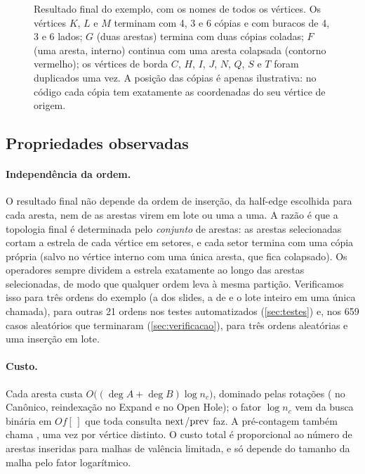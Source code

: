 \begin{figure}[ht]
\centering

\caption{Resultado final do exemplo, com os nomes de todos os vértices. Os vértices $K$, $L$ e $M$ terminam com 4, 3 e 6
cópias e com buracos de 4, 3 e 6 lados; $G$ (duas arestas) termina com duas cópias coladas; $F$ (uma aresta, interno)
continua com uma aresta colapsada (contorno vermelho); os vértices de borda $C$, $H$, $I$, $J$, $N$, $Q$, $S$ e $T$
foram duplicados uma vez. A posição das cópias é apenas ilustrativa: no código cada cópia tem exatamente as
coordenadas do seu vértice de origem.}
\label{fig:final}
\end{figure}

\subsection{Propriedades observadas}

\paragraph{Independência da ordem.} O resultado final não depende da ordem de inserção, da half-edge escolhida para
cada aresta, nem de as arestas virem em lote ou uma a uma. A razão é que a topologia final é determinada pelo
\emph{conjunto} de arestas: as arestas selecionadas cortam a estrela de cada vértice em setores, e cada setor termina com
uma cópia própria (salvo no vértice interno com uma única aresta, que fica colapsado). Os operadores sempre dividem a
estrela exatamente ao longo das arestas selecionadas, de modo que qualquer ordem leva à mesma partição. Verificamos isso
para três ordens do exemplo (a dos slides, a de  e o lote inteiro em uma única chamada), para outras
21 ordens nos testes automatizados (\cref{sec:testes}) e, nos 659 casos aleatórios que terminaram
(\cref{sec:verificacao}), para três ordens aleatórias e uma inserção em lote.

\paragraph{Custo.} Cada aresta custa $O\big((\deg A+\deg B)\log n_c\big)$, dominado pelas rotações ( no
Canônico, reindexação no Expand e no Open Hole); o fator $\log n_c$ vem da busca binária em $Of[\,]$ que toda consulta
$\mathrm{next}$/$\mathrm{prev}$ faz. A pré-contagem também chama , uma vez por vértice distinto. O custo total é proporcional ao
número de arestas inseridas para malhas de valência limitada, e só depende do tamanho da malha pelo fator logarítmico.

